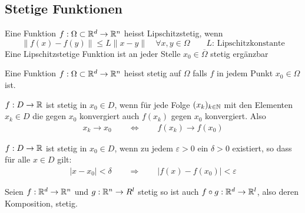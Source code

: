 \documentclass[a4paper]{article}
\begin{document}
			
	\subsection{Stetige Funktionen}
		\begin{fdef}[Lipschitzstetig]
			Eine Funktion $f: \Omega \subset \mathbb{R}^d \rightarrow \mathbb{R}^n$ heisst Lipschitzstetig, wenn
			$$ \| f(x) - f(y) \| \leq L \| x-y \| \quad \forall x,y \in \Omega \qquad L \text{: Lipschitzkonstante}$$
			Eine Lipschitzstetige Funktion ist an jeder Stelle $x_0 \in \overline{\Omega}$ stetig ergänzbar
		\end{fdef}
		\begin{fdef}
			Eine Funktion $f:\Omega \subset \mathbb{R}^d \rightarrow \mathbb{R}^n$ heisst stetig auf $\Omega$ falls $f$ in jedem Punkt $x_0 \in \Omega$ ist.
		\end{fdef}

		\begin{fdef}[Folgenkriterium]
			$f:D \rightarrow \mathbb{R}$ ist stetig in $x_0 \in D$, wenn für jede Folge $(x_k)_{k\in \mathbb{N}}$ mit den Elementen $x_k \in D$ die gegen $x_0$ konvergiert auch $f(x_k)$  gegen $x_0$ konvergiert. Also
			\begin{align*}
				x_k \rightarrow x_0 \qquad \Longleftrightarrow \qquad f(x_k) \rightarrow f(x_0)
			\end{align*}
		\end{fdef}
	
		\begin{fdef}
			$f:D \rightarrow \mathbb{R}$ ist stetig in $x_0 \in D$, wenn zu jedem $\varepsilon > 0$ ein $\delta >0$ existiert, so dass für alle $x \in D$ gilt:
			\begin{align*}
				|x-x_0| < \delta \qquad \Longrightarrow \qquad |f(x)- f(x_0)| < \varepsilon
			\end{align*}
	
		\end{fdef}
		\begin{fsatz}
			Seien $f: \mathbb{R}^d \rightarrow \mathbb{R}^n$ und $g:\mathbb{R}^n \rightarrow R^l$ stetig so ist auch $f \circ g:\mathbb{R}^d \rightarrow \mathbb{R}^l$, also deren Komposition, stetig.
		\end{fsatz}
\end{document}

